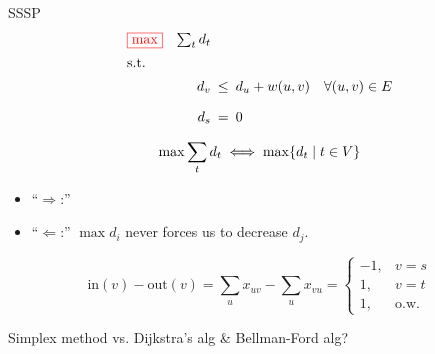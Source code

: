 \begin{frame}{SSSP}
  \begin{equation*}
	\setlength\arraycolsep{2.5pt}
	\begin{array}{l@{\quad}rcl}
	  \color{red}{\boxed{\max}} 	& \sum_{t} d_t	& &	\\[5pt]
	  \text{s.t.} 	& &	\\[5pt]
			& d_v   &\leq& d_u + w(u,v) \quad \forall (u,v) \in E	\\[10pt]
			& d_s	&=& 0 
	\end{array}
  \end{equation*}

  \vspace{0.60cm}

  \[
	\max \sum_{t} d_t \iff \max \{d_t \mid t \in V\}
  \]

  \begin{Proof}
	\begin{itemize}
	  \item ``$\Rightarrow$:''
	  \item ``$\Leftarrow$:'' $\max d_i$ never forces us to decrease $d_j$.
	\end{itemize}
  \end{Proof}

\end{frame}
\begin{frame}
  \[
	 \text{in}(v) - \text{out}(v) 
	 =	\sum_{u} x_{uv} - \sum_{u} x_{vu} 
	 = \left\{\begin{array}{rl}
	  -1,	&	v = s	\\
	  1,	&	v = t	\\
	  1,	&	\text{o.w.}
	\end{array}\right.
  \]
	
  \centerline{Simplex method vs. Dijkstra's alg \& Bellman-Ford alg?}
\end{frame}
